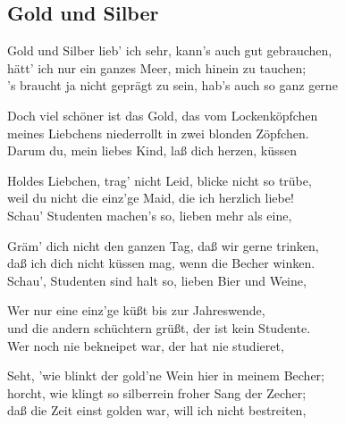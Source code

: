 
\subsection*{Gold und Silber}
%

\thestrophe Gold und Silber lieb' ich sehr, kann's auch gut gebrauchen, \\
hätt' ich nur ein ganzes Meer, mich hinein zu tauchen; \\
's braucht ja nicht geprägt zu sein, hab's auch so ganz gerne \\

\thestrophe Doch viel schöner ist das Gold, das vom Lockenköpfchen \\
meines Liebchens niederrollt in zwei blonden Zöpfchen. \\
Darum du, mein liebes Kind, laß dich herzen, küssen \\

\thestrophe Holdes Liebchen, trag' nicht Leid, blicke nicht so trübe, \\
weil du nicht die einz'ge Maid, die ich herzlich liebe! \\
Schau' Studenten machen's so, lieben mehr als eine, \\

\thestrophe Gräm' dich nicht den ganzen Tag, daß wir gerne trinken, \\
daß ich dich nicht küssen mag, wenn die Becher winken. \\
Schau', Studenten sind halt so, lieben Bier und Weine, \\

\thestrophe Wer nur eine einz'ge küßt bis zur Jahreswende, \\
und die andern schüchtern grüßt, der ist kein Studente. \\
Wer noch nie bekneipet war, der hat nie studieret, \\

\thestrophe Seht, 'wie blinkt der gold'ne Wein hier in meinem Becher; \\
horcht, wie klingt so silberrein froher Sang der Zecher; \\
daß die Zeit einst golden war, will ich nicht bestreiten, \\
